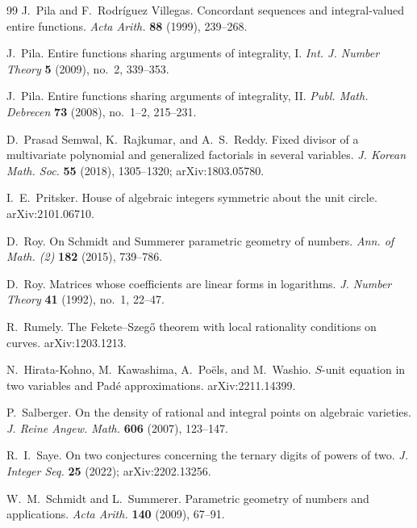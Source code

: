\documentclass[10pt,letterpaper]{article}
\begin{document}
\begin{thebibliography}{99}
J.~Pila and F.~Rodr\'iguez Villegas.
\newblock Concordant sequences and integral-valued entire functions.
\newblock \emph{Acta Arith.} \textbf{88} (1999), 239--268.

J.~Pila.
\newblock Entire functions sharing arguments of integrality, I.
\newblock \emph{Int. J. Number Theory} \textbf{5} (2009), no.~2, 339--353.

J.~Pila.
\newblock Entire functions sharing arguments of integrality, II.
\newblock \emph{Publ. Math. Debrecen} \textbf{73} (2008), no.~1--2, 215--231.

D.~Prasad Semwal, K.~Rajkumar, and A.~S.~Reddy.
\newblock Fixed divisor of a multivariate polynomial and generalized factorials in several variables.
\newblock \emph{J. Korean Math. Soc.} \textbf{55} (2018), 1305--1320; arXiv:1803.05780.

I.~E.~Pritsker.
\newblock House of algebraic integers symmetric about the unit circle.
\newblock arXiv:2101.06710.

D.~Roy.
\newblock On Schmidt and Summerer parametric geometry of numbers.
\newblock \emph{Ann. of Math. (2)} \textbf{182} (2015), 739--786.

D.~Roy.
\newblock Matrices whose coefficients are linear forms in logarithms.
\newblock \emph{J. Number Theory} \textbf{41} (1992), no.~1, 22--47.

R.~Rumely.
\newblock The Fekete--Szeg\H{o} theorem with local rationality conditions on curves.
\newblock arXiv:1203.1213.

N.~Hirata-Kohno, M.~Kawashima, A.~Po\"els, and M.~Washio.
\newblock $S$-unit equation in two variables and Pad\'e approximations.
\newblock arXiv:2211.14399.

P.~Salberger.
\newblock On the density of rational and integral points on algebraic varieties.
\newblock \emph{J. Reine Angew. Math.} \textbf{606} (2007), 123--147.

R.~I.~Saye.
\newblock On two conjectures concerning the ternary digits of powers of two.
\newblock \emph{J. Integer Seq.} \textbf{25} (2022); arXiv:2202.13256.

W.~M.~Schmidt and L.~Summerer.
\newblock Parametric geometry of numbers and applications.
\newblock \emph{Acta Arith.} \textbf{140} (2009), 67--91.


\end{thebibliography}
\end{document}
